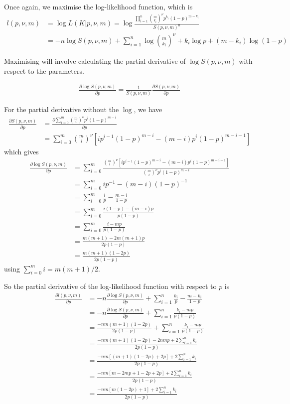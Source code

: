 \documentclass[a4paper,12pt]{article}
\theoremstyle{definition}
\newcommand{\pdiff}[2]{\frac{\partial #1}{\partial #2}} %
\begin{document}
Once again, we maximise the log-likelihood function, which is
\begin{align}
  l(p, \nu, m) &= \log L(K | p, \nu, m) = \log \frac{\prod_{i=1}^{n} \binom{m}{k_i}^{\nu} p^{k_i} (1-p)^{m-k_i}}{S(p, \nu, m)^n} \\
  &= - n \log S(p, \nu, m) + \sum_{i=1}^{n} \log \binom{m}{k_i}^{\nu} + k_i \log p + (m - k_i) \log (1-p)
\end{align}

Maximising will involve calculating the partial derivative of $\log S(p, \nu, m)$ with respect to the parameters. 

\begin{align}
  \pdiff{\log S(p, \nu, m)}{p} = \frac{1}{S(p, \nu, m)} \pdiff{S(p, \nu, m)}{p}
\end{align}

For the partial derivative without the $\log$, we have
\begin{align}
  \pdiff{S(p, \nu, m)}{p} &= \pdiff{\sum_{i=0}^m \binom{m}{i}^{\nu} p^i (1-p)^{m-i}}{p} \\
  & = \sum_{i=0}^m \binom{m}{i}^{\nu} \left[ i p^{i-1}(1-p)^{m-i} - (m-i)p^i(1-p)^{m-i-1} \right]
\end{align}
which gives
\begin{align}
  \pdiff{\log S(p, \nu, m)}{p} & = \sum_{i=0}^m \frac{\binom{m}{i}^{\nu} \left[ i p^{i-1}(1-p)^{m-i} - (m-i)p^i(1-p)^{m-i-1} \right]}{\binom{m}{i}^{\nu} p^{i} (1-p)^{m-i}} \\
  & = \sum_{i=0}^m i p^{-1} - (m-i) (1-p)^{-1} \\
  & = \sum_{i=0}^m \frac{i}{p} - \frac{m-i}{1-p} \\
  & = \sum_{i=0}^m \frac{i(1-p) - (m-i)p}{p(1-p)} \\
  & = \sum_{i=0}^m \frac{i - mp}{p(1-p)} \\
  & = \frac{m(m+1) -2m(m+1)p}{2p(1-p)} \\
  & = \frac{m(m+1)(1-2p)}{2p(1-p)}
\end{align}
using $\sum_{i=0}^{m} i = m(m+1)/2$.

So the partial derivative of the log-likelihood function with respect to $p$ is
\begin{align}
  \pdiff{l(p,\nu,m)}{p} & = -n \pdiff{\log S(p, \nu, m)}{p} + \sum_{i=1}^n \frac{k_i}{p} - \frac{m-k_i}{1-p} \\
  & = -n \pdiff{\log S(p, \nu, m)}{p} + \sum_{i=1}^n \frac{k_i - mp}{p(1-p)} \\
  & = \frac{-nm(m+1)(1-2p)}{2p(1-p)} + \sum_{i=1}^n \frac{k_i - mp}{p(1-p)} \\
  & = \frac{-nm(m+1)(1-2p) - 2nmp + 2\sum_{i=1}^n k_i}{2p(1-p)} \\
  & = \frac{-nm\left[ (m+1)(1-2p) + 2p \right] + 2\sum_{i=1}^n k_i}{2p(1-p)} \\
  & = \frac{-nm \left[m - 2mp + 1 -2p +2p \right] + 2 \sum_{i=1}^n k_i}{2p(1-p)} \\
  & = \frac{-nm\left[ m(1-2p) + 1\right] + 2 \sum_{i=1}^n k_i}{2p(1-p)}
\end{align}

\newpage

\end{document}
